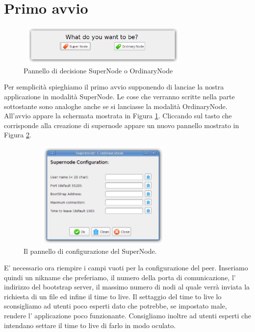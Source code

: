 \section{Primo avvio}
\begin{figure}[t]
 \centering
 \includegraphics[width=325px,height=75px]{images/what.eps}
 \caption{Pannello di decisione SuperNode o OrdinaryNode}
 \label{fig:what}
\end{figure}
Per semplicità spieghiamo il primo avvio supponendo di lanciae la nostra applicazione in modalità SuperNode.
Le cose che verranno scritte nella parte sottostante sono analoghe anche se si lanciasse la modalità
OrdinaryNode.
All'avvio appare la schermata mostrata in Figura \ref{fig:what}.
Cliccando sul tasto che corrisponde alla creazione di supernode appare un nuovo pannello mostrato 
in Figura \ref{fig:configuration}.
\begin{figure}[t]
 \centering
 \includegraphics[width=325px,height=200px]{images/configuration.eps}
 \caption{Il pannello di configurazione del SuperNode.}
 \label{fig:configuration}
\end{figure}
E' necessario ora riempire i campi vuoti per la configurazione del peer.
Inseriamo quindi un nikname che preferiamo, il numero della porta di comunicazione, l' indirizzo del bootstrap server,
il massimo numero di nodi al quale verrà inviata la richiesta di un file ed infine il time to live.
Il settaggio del time to live lo sconsigliamo ad utenti poco esperti dato che potrebbe, se impostato male, rendere l' applicazione
poco funzionante.
Consigliamo inoltre ad utenti esperti che intendano settare il time to live di farlo in modo oculato. 
